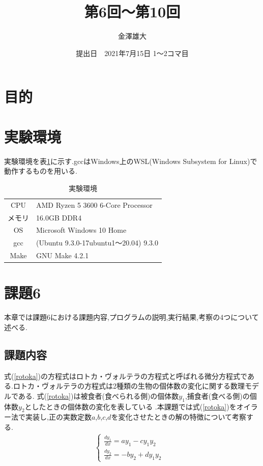\documentclass[a4j]{jarticle}
\title{第6回～第10回}
\date{提出日　2021年7月15日 1～2コマ目}
\author{金澤雄大}
\begin{document}
    \maketitle
    \thispagestyle{empty}
    \clearpage
    \addtocounter{page}{-1}

    \section{目的}

    \section{実験環境}
      実験環境を表\ref{env}に示す.gccはWindows上のWSL(Windows Subsystem for Linux)で動作するものを用いる.
      \begin{table}[H]
        \caption{実験環境}
      \label{env}
      \begin{center}
          \begin{tabular}{c|l}\hline
            CPU & AMD Ryzen 5 3600 6-Core Processor \\ 
            メモリ & 16.0GB DDR4 \\
            OS & Microsoft Windows 10 Home \\
            gcc & (Ubuntu 9.3.0-17ubuntu1～20.04) 9.3.0 \\
            Make & GNU Make 4.2.1 \\ \hline
          \end{tabular}
      \end{center}
      \end{table}

      \section{課題6}
      本章では課題6における課題内容,プログラムの説明,実行結果,考察の4つについて述べる.
      \subsection{課題内容}
      式(\ref{rotoka})の方程式はロトカ・ヴォルテラの方程式と呼ばれる微分方程式である.ロトカ・ヴォルテラの方程式は2種類の生物の個体数の変化に関する数理モデルである.
      式(\ref{rotoka})は被食者(食べられる側)の個体数$y_1$,捕食者(食べる側)の個体数$y_2$としたときの個体数の変化を表している
      .本課題では式(\ref{rotoka})をオイラー法で実装し,正の実数定数$a$,$b$,$c$,$d$を変化させたときの解の特徴について考察する.
      \begin{eqnarray}
      \begin{cases}
        \frac{dy_1}{dx} = ay_1-cy_1y_2 & \\
        \frac{dy_2}{dx} = -by_2+dy_1y_2 &
      \end{cases}
      \label{rotoka}
    \end{eqnarray}
\end{document}
